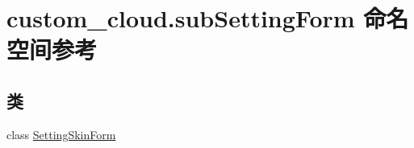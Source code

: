 \hypertarget{namespacecustom__cloud_1_1sub_setting_form}{}\section{custom\+\_\+cloud.\+sub\+Setting\+Form 命名空间参考}
\label{namespacecustom__cloud_1_1sub_setting_form}
\subsection*{类}
\begin{DoxyCompactItemize}
\item 
class \hyperlink{classcustom__cloud_1_1sub_setting_form_1_1_setting_skin_form}{Setting\+Skin\+Form}
\end{DoxyCompactItemize}
